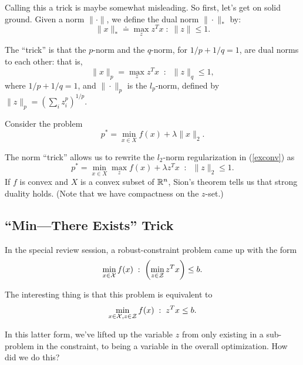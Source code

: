 \documentclass[12pt]{article}
\begin{document}
Calling this a trick is maybe somewhat misleading. So first, let's get on solid ground. Given a norm $\|\cdot \|$, we define the dual norm $\|\cdot\|_*$ by:
%
\begin{equation*}
\|x\|_* \doteq \max_{z} z^T x \; : \; \|z\| \leq 1.
\end{equation*}

The ``trick'' is that the $p$-norm and the $q$-norm, for $1/p + 1/q = 1$, are dual norms to each other: that is,
%
\begin{equation*}
\|x\|_p = \max_z z^T x \;\; : \;\; \|z\|_q \leq 1,
\end{equation*}
%
where $1/p + 1/q = 1$, and $\| \cdot \|_p$ is the $l_p$-norm, defined by $\|z\|_p = (\sum_i z_i^p)^{1/p}$. 


\begin{example}
Consider the problem 
%
\begin{equation}
p^* = \min_{x \in X} f(x) + \lambda \|x\|_2.
\label{exconv}
\end{equation}

The norm ``trick'' allows us to rewrite the $l_2$-norm regularization in (\ref{exconv}) as
%
\begin{equation*}
p^* = \min_{x \in X} \max_{z} f(x) + \lambda z^T x \;\; : \;\; \|z\|_2 \leq 1.
\end{equation*}
%
If $f$ is convex and $X$ is a convex subset of ${ {\mathbb R}^{n} }$, Sion's theorem tells us that strong duality holds. (Note that we have compactness on the $z$-set.) 
\end{example}

\subsection{``Min---There Exists'' Trick}

In the special review session, a robust-constraint problem came up with the form
%
\begin{equation*}
\min_{x \in {\mathcal X}} f(x) \; : \; \left(\min_{z \in {\mathcal Z}} z^T x\right) \leq b.
\end{equation*}

The interesting thing is that this problem is equivalent to
%
\begin{equation*}
\min_{x \in {\mathcal X}, z \in {\mathcal Z}} f(x) \; : \; z^T x \leq b.
\end{equation*}

In this latter form, we've lifted up the variable $z$ from only existing in a sub-problem in the constraint, to being a variable in the overall optimization. How did we do this?
\end{document}
